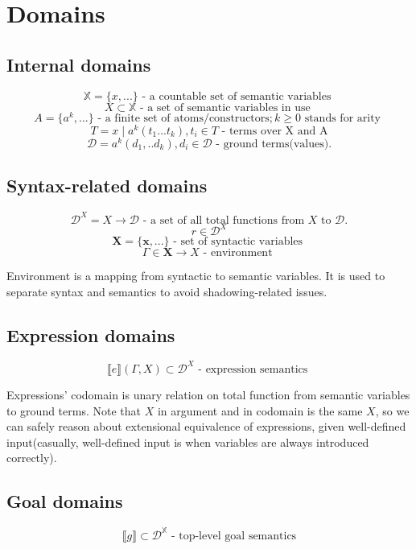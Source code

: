 \documentclass[fleqn]{article}
\begin{document}
\newcommand{\keyword}[1]{\textrm{\textbf{#1}}}
\newcommand{\semantics}[1]{\llbracket#1\rrbracket}
\section{Domains}
\subsection{Internal domains}
\[\mathbb{X} = \{x,...\} \textrm{ - a countable set of semantic variables }\]
\[ X \subset \mathbb{X} \textrm{ - a set of semantic variables in use }\]
\[ A = \{a^k, ...\} \textrm{ - a finite set of atoms/constructors}; k \geq 0 \textrm{ stands for arity }\]
\[ T = x \mid a^k(t_1...t_k), t_i \in T \textrm{ - terms over X and A}\]
\[ \mathcal{D} = a^k(d_1,..d_k), d_i \in \mathcal{D} \textrm{ - ground terms(values).}\]
\subsection{Syntax-related domains}
\[ \mathcal{D}^X = X \rightarrow \mathcal{D} \textrm{ - a set of all total functions from } X \textrm{ to } \mathcal{D}.\]
\[r \in \mathcal{D}^X\]
\[ \mathbf{X} = \{ \mathbf{x}, ... \}\textrm{ - set of syntactic variables }\]
\[ \Gamma \in \mathbf{X} \rightarrow X \textrm{ - environment }\]

Environment is a mapping from syntactic to semantic variables. It is used to separate syntax and semantics to avoid shadowing-related issues.

\subsection{Expression domains}

\[ \semantics{e}(\Gamma, X) \subset \mathcal{D}^X \textrm{ - expression semantics }\]

Expressions' codomain is unary relation on total function from semantic variables to ground terms. Note that \(X\) in argument and in codomain is the same \(X\), so we can safely reason about extensional equivalence of expressions, given well-defined input(casually, well-defined input is when variables are always introduced correctly).
\subsection{Goal domains}

\[ \semantics{g} \subset \mathcal{D}^\mathbb{X} \textrm{ - top-level goal semantics} \]
\end{document}
